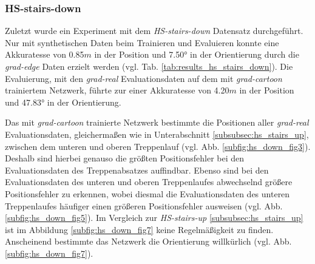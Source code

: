 \subsubsection{HS-stairs-down}

Zuletzt wurde ein Experiment mit dem \textit{HS-stairs-down} Datensatz durchgeführt. Nur mit synthetischen Daten beim Trainieren und Evaluieren konnte eine Akkuratesse von 0.85$m$ in der Position und 7.50° in der Orientierung durch die \textit{grad-edge} Daten erzielt werden (vgl. Tab. \ref{tab:results_hs_stairs_down}). Die Evaluierung, mit den \textit{grad-real} Evaluationsdaten auf dem mit \textit{grad-cartoon} trainiertem Netzwerk, führte zur einer Akkuratesse von 4.20$m$ in der Position und 47.83° in der Orientierung. 



Das mit \textit{grad-cartoon} trainierte Netzwerk bestimmte die Positionen aller \textit{grad-real} Evaluationsdaten, gleichermaßen wie in Unterabschnitt \ref{subsubsec:hs_stairs_up}, zwischen dem unteren und oberen Treppenlauf (vgl. Abb. \ref{subfig:hs_down_fig3}). Deshalb sind hierbei genauso die größten Positionsfehler bei den Evaluationsdaten des Treppenabsatzes auffindbar. Ebenso sind bei den Evaluationsdaten des unteren und oberen Treppenlaufes abwechselnd größere Positionsfehler zu erkennen, wobei diesmal die Evaluationsdaten des unteren Treppenlaufes häufiger einen größeren Positionsfehler ausweisen (vgl. Abb. \ref{subfig:hs_down_fig5}). Im Vergleich zur \textit{HS-stairs-up} \ref{subsubsec:hs_stairs_up} ist im Abbildung \ref{subfig:hs_down_fig7} keine Regelmäßigkeit zu finden. Anscheinend bestimmte das Netzwerk die Orientierung willkürlich (vgl. Abb. \ref{subfig:hs_down_fig7}).

